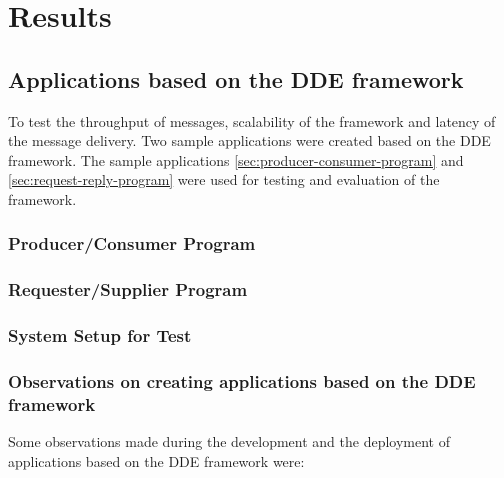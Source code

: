 \chapter{Results}
\label{chapter:results}

\section{Applications based on the DDE framework}
\label{sec:result-applications}
  To test the throughput of messages, scalability of the framework and latency of the message delivery. Two sample applications were created based on the DDE framework. The sample applications \autoref{sec:producer-consumer-program} and
  \autoref{sec:request-reply-program} were used for testing and evaluation of the framework.

\subsection{Producer/Consumer Program}
\label{sec:producer-consumer-program}


\subsection{Requester/Supplier Program}
\label{sec:request-reply-program}


\subsection{System Setup for Test}

\subsection{Observations on creating applications based on the DDE framework}
\label{subsec:result-framework}
   Some observations made during the development and the deployment of applications based on the DDE framework were:

